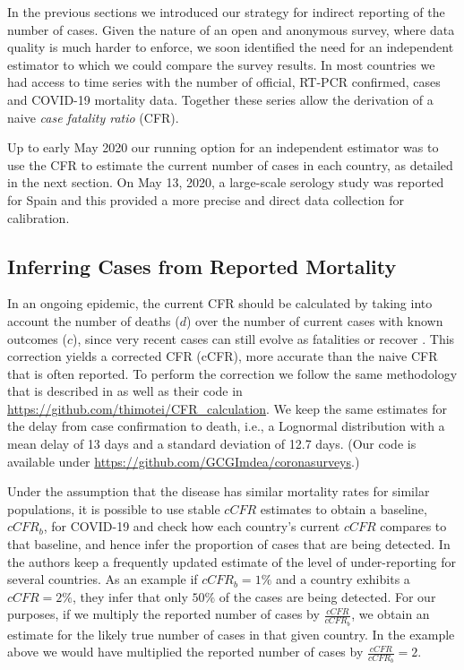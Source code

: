 \documentclass[sigconf]{acmart}
\newcommand{\cb}[1]{{#1}}
\newcommand{\hh}[1]{{#1}}
\begin{document}
In the previous sections we introduced our strategy for indirect reporting of the number of cases. Given the nature of an open and anonymous survey, where data quality is much harder to enforce, we soon identified the need for an independent estimator to which we could compare the survey results. In most countries we had access to time series with the number of official, RT-PCR confirmed, cases and COVID-19 mortality data. Together these series allow the derivation of a naive \emph{case fatality ratio} (CFR). 

Up to early May 2020 our running option for an independent estimator was to use the CFR to estimate the current number of cases in each country, as detailed in the next section. On May 13, 2020, a large-scale serology study was reported for Spain \cite{ENEcovid19} and this provided a more precise and direct data collection for calibration. 

\subsection{Inferring Cases from Reported Mortality}

In an ongoing epidemic, the current CFR should be calculated by taking into account the number of deaths \hh{($d$)} over the number of current cases with known outcomes \hh{($c$)}, since very recent cases can still evolve as fatalities or recover \cite{nishiura2009early}. This correction yields a corrected CFR (cCFR), more accurate than the naive CFR that is often reported. \cb{To perform the correction we follow the same methodology that is described in \cite{russel2020using} as well as their code in \url{https://github.com/thimotei/CFR_calculation}. We keep the same estimates for the delay from case confirmation to death, i.e., a Lognormal distribution with a mean delay of 13 days and a standard deviation of 12.7 days. (Our code is available under \url{https://github.com/GCGImdea/coronasurveys}.)}

Under the assumption that the disease has similar mortality rates for similar populations, it is possible to use stable $\textit{cCFR}$ estimates to obtain a baseline, $\textit{cCFR}_b$, for COVID-19 and check how each country's current $\textit{cCFR}$ compares to that baseline, and hence infer the proportion of cases that are being detected. \cb{In \cite{russel2020using} the authors keep a frequently updated estimate of the level of under-reporting for several countries. As an example if $\textit{cCFR}_b=1\%$ and a country exhibits a $\textit{cCFR}=2\%$, they infer that only $50\%$ of the cases are being detected.}   
%
\cb{For our purposes, if we multiply the reported number of cases by $\frac{\textit{cCFR}}{\textit{cCFR}_b}$, we obtain an estimate for the likely true number of cases in that given country. In the example above we would have multiplied the reported number of cases by $\frac{\textit{cCFR}}{\textit{cCFR}_b}=2$.}
\end{document}
